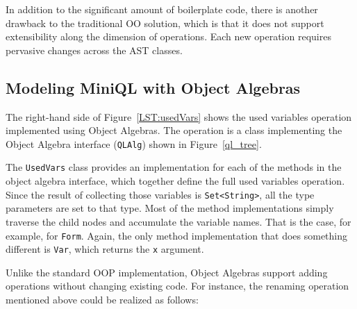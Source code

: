 
In addition to the significant amount of boilerplate code, there is
another drawback to the traditional OO solution, which is that it does
not support extensibility along the dimension of operations. Each new
operation requires pervasive changes across the AST classes.


\subsection{Modeling MiniQL with Object Algebras}\label{subsec:model_ql_with_oa}

The right-hand side of Figure~\ref{LST:usedVars} shows the used
variables operation implemented using Object Algebras. The operation
is a class implementing the Object Algebra interface
(\lstinline{QLAlg}) shown in Figure~\ref{ql_tree}.


The \lstinline{UsedVars} class provides an implementation for each
of the methods in the object algebra interface, which together define the
full used variables operation. Since the result of collecting those
variables is \lstinline{Set<String>}, all the type parameters are set to
that type. Most of the method implementations simply traverse the
child nodes and accumulate the variable names. That is the case, for
example, for \lstinline{Form}. Again, the only method implementation that does
something different is \lstinline{Var}, which returns the \lstinline{x}
argument.

Unlike the standard OOP implementation,
Object Algebras support adding operations without changing existing code.
For instance, the renaming operation mentioned above could be realized
as follows:

